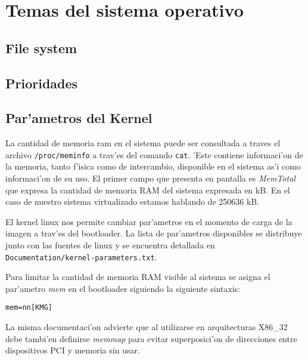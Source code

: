 \section{Temas del sistema operativo}
\subsection{File system}
\subsection{Prioridades}
\subsection{Par'ametros del Kernel}
La cantidad de memoria ram en el sistema puede ser consultada a traves el archivo \texttt{/proc/meminfo} a trav'es del comando \texttt{cat}. 'Este contiene informaci'on de la memoria, tanto f'isica como de intercambio, disponible en el sistema as'i como informaci'on de su uso. El primer campo que presenta en pantalla es \emph{MemTotal} que expresa la cantidad de memoria RAM del sistema expresada en kB. En el caso de nuestro sistema virtualizado estamos hablando de 250636 kB.

El kernel linux nos permite cambiar par'ametros en el momento de carga de la imagen a trav'es del bootloader. La lista de par'ametros disponibles se distribuye junto con las fuentes de linux y se encuentra detallada en \texttt{Documentation/kernel-parameters.txt}.

Para limitar la cantidad de memoria RAM visible al sistema se asigna el par'ametro \emph{mem} en el bootloader siguiendo la siguiente sintaxis:

\texttt{mem=nn[KMG]}

La misma documentaci'on advierte que al utilizarse en arquitecturas X86\_32 debe tambi'en definirse \emph{memmap} para evitar superposici'on de direcciones entre dispositivos PCI y memoria sin usar.
